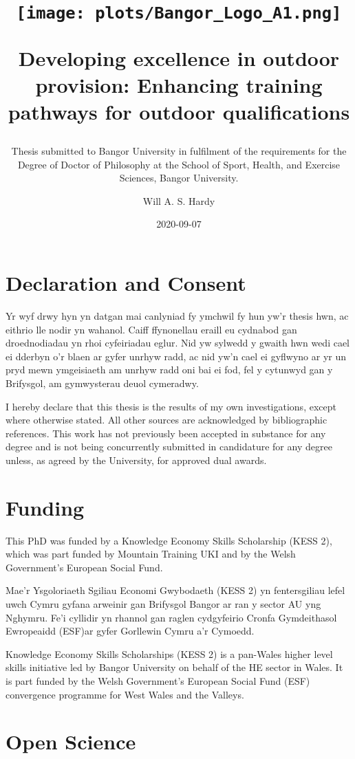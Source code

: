 \documentclass[
  12pt,
  a4paper,
]{book}
\title{\texttt{[image: plots/Bangor\_Logo\_A1.png]}

\textbf{Developing excellence in outdoor provision: Enhancing training pathways for outdoor qualifications}}
\subtitle{\hfill \break  Thesis submitted to Bangor University in fulfilment of the requirements for the Degree of Doctor of Philosophy at the School of Sport, Health, and Exercise Sciences, Bangor University.}
\author{Will A. S. Hardy}
\date{2020-09-07}
\begin{document}
\maketitle

\frontmatter

\section*{Declaration and Consent}

Yr wyf drwy hyn yn datgan mai canlyniad fy ymchwil fy hun yw’r thesis hwn, ac eithrio lle nodir yn wahanol. Caiff ffynonellau eraill eu cydnabod gan droednodiadau yn rhoi cyfeiriadau eglur. Nid yw sylwedd y gwaith hwn wedi cael ei dderbyn o’r blaen ar gyfer unrhyw radd, ac nid yw’n cael ei gyflwyno ar yr un pryd mewn ymgeisiaeth am unrhyw radd oni bai ei fod, fel y cytunwyd gan y Brifysgol, am gymwysterau deuol cymeradwy.  

I hereby declare that this thesis is the results of my own investigations, except where otherwise stated.  All other sources are acknowledged by bibliographic references. This work has not previously been accepted in substance for any degree and is not being concurrently submitted in candidature for any degree unless, as agreed by the University, for approved dual awards.  


\section*{Funding}

This PhD was funded by a Knowledge Economy Skills Scholarship (KESS 2), which was part funded by Mountain Training UKI and by the Welsh Government's European Social Fund.

Mae’r Ysgoloriaeth Sgiliau Economi Gwybodaeth (KESS 2) yn fentersgiliau lefel uwch Cymru gyfana arweinir gan Brifysgol Bangor ar ran y sector AU yng Nghymru. Fe’i cyllidir yn rhannol gan raglen cydgyfeirio Cronfa Gymdeithasol Ewropeaidd (ESF)ar gyfer Gorllewin Cymru a’r Cymoedd.

Knowledge Economy Skills Scholarships (KESS 2) is a pan-Wales higher level skills initiative led by Bangor University on behalf of the HE sector in Wales. It is part funded by the Welsh Government’s European Social Fund (ESF) convergence programme for West Wales and the Valleys.

\section*{Open Science}
\end{document}
